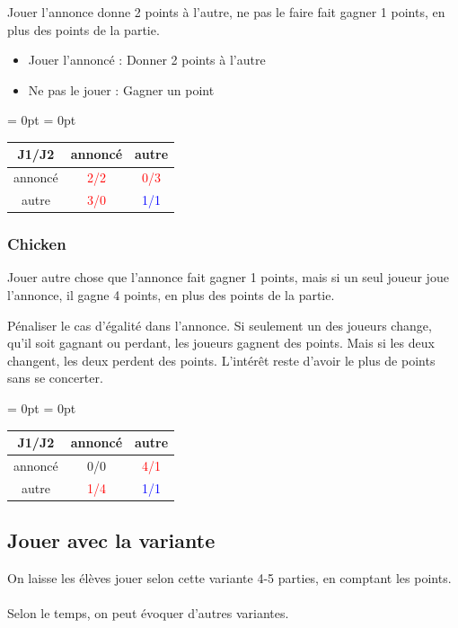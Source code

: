 \documentclass{article}
\begin{document}
    Jouer l'annonce donne 2 points à l'autre, ne pas le faire fait gagner 1 points, en plus des points de la partie. 

    \begin{itemize}
        \item Jouer l'annoncé : Donner 2 points à l'autre
        \item Ne pas le jouer : Gagner un point
    \end{itemize}
    
    \begin{table}[H]
    \renewcommand{\arraystretch}{2}%
    \centering
    \aboverulesep = 0pt
    \belowrulesep = 0pt
    \begin{tabular}{c|c|c}
        J1/J2 & annoncé & autre  \\ \midrule
        annoncé & \textcolor{red}{2/2} & \textcolor{red}{0/3}  \\ \midrule
        autre & \textcolor{red}{3/0} & \textcolor{blue}{1/1} \\ 
    \end{tabular}
    \end{table}

\subsubsection{Chicken}

    Jouer autre chose que l'annonce fait gagner 1 points, mais si un seul joueur joue l'annonce, il gagne 4 points, en plus des points de la partie.
    
    Pénaliser le cas d'égalité dans l'annonce.
    Si seulement un des joueurs change, qu'il soit gagnant ou perdant, les joueurs gagnent des points. Mais si les deux changent, les deux perdent des points. L'intérêt reste d'avoir le plus de points sans se concerter.
    
    \begin{table}[H]
    \renewcommand{\arraystretch}{2}%
    \centering
    \aboverulesep = 0pt
    \belowrulesep = 0pt
    \begin{tabular}{c|c|c}
        J1/J2 & annoncé & autre  \\ \midrule
        annoncé & {0/0} & \textcolor{red}{4/1}  \\ \midrule
        autre & \textcolor{red}{1/4} & \textcolor{blue}{1/1} \\ 
    \end{tabular}
    \end{table}
\subsection{Jouer avec la variante}
On laisse les élèves jouer selon cette variante 4-5 parties, en comptant les points. 
\\
\\
Selon le temps, on peut évoquer d'autres variantes.
\end{document}
